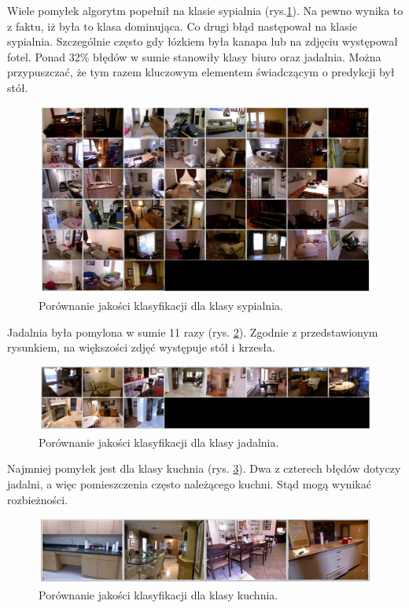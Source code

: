 Wiele pomyłek algorytm popełnił na klasie sypialnia (rys.\ref{fig:bedroom-false-pred}). Na pewno wynika to z faktu, iż była to klasa dominująca. Co drugi błąd następował na klasie sypialnia. Szczególnie często gdy łózkiem była kanapa lub na zdjęciu występował fotel. Ponad 32\% błędów w sumie stanowiły klasy biuro oraz jadalnia. Można przypuszczać, że tym razem kluczowym elementem świadczącym o predykcji był stół.
\begin{figure}[ht!]
    \centering
    \includegraphics[width=\textwidth]{img/preds_analysis/classification/bedroom-2.png}
    \caption{Porównanie jakości klasyfikacji dla klasy sypialnia.}
    \label{fig:bedroom-false-pred}
\end{figure}

Jadalnia była pomylona w sumie 11 razy (rys. \ref{fig:dining_room-false-pred}). Zgodnie z przedstawionym rysunkiem, na większości zdjęć występuje stół i krzesła.

\begin{figure}[ht!]
    \centering
    \includegraphics[width=\textwidth]{img/preds_analysis/classification/dining_room-2.png}
    \caption{Porównanie jakości klasyfikacji dla klasy jadalnia.}
    \label{fig:dining_room-false-pred}
\end{figure}

Najmniej pomyłek jest dla klasy kuchnia (rys. \ref{fig:kitchen-false-pred}). Dwa z czterech błędów dotyczy jadalni, a więc pomieszczenia często należącego kuchni. Stąd mogą wynikać rozbieżności.
\begin{figure}[ht!]
    \centering
    \includegraphics[width=\textwidth]{img/preds_analysis/classification/kitchen-2.png}
    \caption{Porównanie jakości klasyfikacji dla klasy kuchnia.}
    \label{fig:kitchen-false-pred}
\end{figure}


